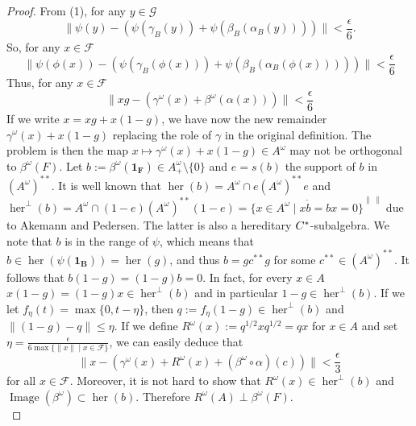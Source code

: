 \documentclass[10pt,a4paper]{amsart}
\def \Image{\operatorname{Image}}
\def\her{\operatorname{her}}
\newcommand{\mc}{\mathcal}
\begin{document}
\begin{proof}
From (1), for any  $y \in \mc{G}$  
\begin{equation}
\| \psi(y) -(\psi(\gamma_B (y))+ \psi (\beta_B(\alpha_B(y)))) \| < \frac{\epsilon}{6}.
\end{equation}
So, for  any $x \in \mc{F}$
\begin{equation}
\| \psi(\phi(x)) -(\psi(\gamma_B (\phi(x)))+ \psi (\beta_B(\alpha_B(\phi(x))))) \| < \frac{\epsilon}{6}
\end{equation}
Thus, for  any $x \in \mc{F}$
\begin{equation}
\| xg -(\gamma^{\omega} (x)+  \beta^{\omega} (\alpha(x)) ) \| < \frac{\epsilon}{6}
\end{equation}
If we write $x=xg+ x(1-g)$, we have now the new remainder $\gamma^{\omega}(x) + x(1-g)$ replacing the role of $\gamma$ in the original definition. The problem is then the map $x \mapsto \gamma^{\omega}(x)+ x(1-g) \in A^{\omega}$ may not be orthogonal to $\beta^{\omega}(F)$. Let $b:=\beta^{\omega}(\mathbf{1_F}) \in A^{\omega}_{+} \setminus \{0\}$ and  $e=s(b)$ the support of $b$ in $(A^{\omega})^{**}$. It is well known that $\her(b)= A^{\omega}\cap e(A^{\omega})^{**}e$    and $\her^{\perp}(b)= A^{\omega}\cap (1-e)(A^{\omega})^{**}(1-e)= \overline{\{x \in A^{\omega} \mid xb=bx=0 \}}^{\| \,\|}$ due to Akemann and Pedersen. The latter is also a hereditary $C\sp*$-subalgebra.  
We note that $b$ is in the range of $\psi$, which means that $b \in \her(\psi(\mathbf{1_B}))=\her(g)$, and thus  $b=gc^{**}g$ for some $c^{**} \in (A^{\omega})^{**}$.  It follows that $b(1-g)=(1-g)b=0$. In fact, for every $x\in A$ $x(1-g)=(1-g)x \in \her^{\perp}(b)$ and in particular $1-g \in \her^{\perp}(b)$.  If we let $f_{\eta}(t)=\max\{0, t-\eta\}$, then $q:= f_{\eta}(1-g) \in \her^{\perp}(b)$ and $\| (1-g) -q\| \le \eta$. If we define $R^{\omega}(x):=q^{1/2}xq^{1/2}=qx$ for $x\in A$ and set $\eta= \frac{\epsilon}{ 6 \max\{ \|x\| \mid x\in \mc{F}\}}$, we can easily deduce that 
\begin{equation}
\| x - (\gamma^{\omega}(x) + R^{\omega}(x) + (\beta^{\omega}\circ \alpha)(c)) \| < \frac{\epsilon}{3}
\end{equation}
for all $x\in \mc{F}$. 
Moreover,  it is not hard to show that $R^{\omega}(x)\in \her^{\perp}(b)$ and $\Image( \beta^{\omega} )\subset \her(b)$. Therefore $R^{\omega}(A) \perp \beta^{\omega}(F)$.\\


\end{proof}
\end{document}
